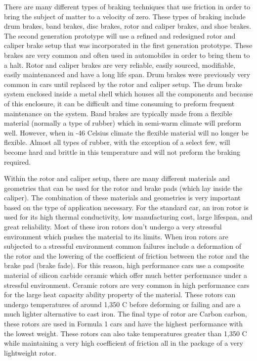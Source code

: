 \indent\indent There are many different types of braking techniques that use friction in order to bring the subject of matter to a velocity of zero. These types of braking include drum brakes, band brakes, disc brakes, rotor and caliper brakes, and shoe brakes. The second generation prototype will use a refined and redesigned rotor and caliper brake setup that was incorporated in the first generation prototype. These brakes are very common and often used in automobiles in order to bring them to a halt. Rotor and caliper brakes are very reliable, easily sourced, modifiable, easily maintenanced and have a long life span. Drum brakes were previously very common in cars until replaced by the rotor and caliper setup. The drum brake system enclosed inside a metal shell which houses all the components and because of this enclosure, it can be difficult and time consuming to preform frequent maintenance on the system. Band brakes are typically made from a flexible material (normally a type of rubber) which in semi-warm climate will preform well. However, when in -46 \degree Celsius climate the flexible material will no longer be flexible. Almost all types of rubber, with the exception of a select few, will become hard and brittle in this temperature and will not preform the braking required.

\indent\indent Within the rotor and caliper setup, there are many different materials and geometries that can be used for the rotor and brake pads (which lay inside the caliper). The combination of these materials and geometries is very important based on the type of application necessary. For the standard car, an iron rotor is used for its high thermal conductivity, low manufacturing cost, large lifespan, and great reliability. Most of these iron rotors don’t undergo a very stressful environment which pushes the material to its limits. When iron rotors are subjected to a stressful environment common failures include a deformation of the rotor and the lowering of the coefficient of friction between the rotor and the brake pad (brake fade). For this reason, high performance cars use a composite material of silicon carbide ceramic which offer much better performance under a stressful environment. Ceramic rotors are very common in high performance cars for the large heat capacity ability property of the material. These rotors can undergo temperatures of around 1,350 \degree C before deforming or failing and are a much lighter alternative to cast iron. The final type of rotor are Carbon carbon, these rotors are used in Formula 1 cars and have the highest performance with the lowest weight. These rotors can also take temperatures greater than 1,350 \degree C while maintaining a very high coefficient of friction all in the package of a very lightweight rotor.

